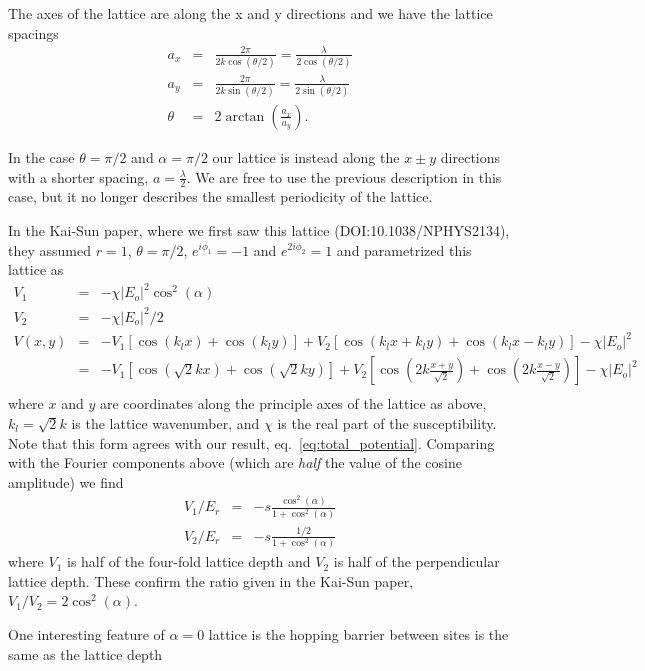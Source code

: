 \documentclass{article}
\theoremstyle{definition}
\begin{document}
The axes of the lattice are along the x and y directions and we have the lattice spacings
\begin{eqnarray}
  a_x &=& \frac{2\pi}{2k\cos(\theta/2)} = \frac{\lambda}{2\cos(\theta/2)} \\
  a_y &=& \frac{2\pi}{2k\sin(\theta/2)} = \frac{\lambda}{2\sin(\theta/2)} \\
  \theta &=& 2 \arctan \left( \frac{a_x}{a_y} \right).
\end{eqnarray}

In the case $\theta = \pi/2$ and $\alpha = \pi/2$ our lattice is instead along the $x\pm y$ directions with a shorter spacing, $a = \frac{\lambda}{2}$. We are free to use the previous description in this case, but it no longer describes the smallest periodicity of the lattice.


In the Kai-Sun paper, where we first saw this lattice (DOI:10.1038/NPHYS2134), they assumed $r=1$, $\theta = \pi/2$, $e^{i\phi_1} = -1$ and $e^{2i\phi_2} = 1$ and parametrized this lattice as
\begin{eqnarray}
  V_1 &=& -\chi |E_o|^2 \cos^2(\alpha) \\
  V_2 &=& -\chi |E_o|^2 /2 \\
  V(x,y) &=& -V_1 [\cos(k_l x) + \cos(k_l y)] + V_2[\cos(k_l x+k_l y) + \cos(k_l x - k_l y)] - \chi |E_o|^2\\
  &=& -V_1 [\cos(\sqrt{2} k x) + \cos(\sqrt{2} k y)] + V_2 \left[\cos \left(2 k \frac{x+y}{\sqrt{2}} \right) + \cos \left(2 k \frac{x-y}{\sqrt{2}}\right) \right] - \chi |E_o|^2\\
\end{eqnarray}
where $x$ and $y$ are coordinates along the principle axes of the lattice as above, $k_l = \sqrt{2}k$ is the lattice wavenumber, and $\chi$ is the real part of the susceptibility. Note that this form agrees with our result, eq.~\ref{eq:total_potential}.  Comparing with the Fourier components above (which are \emph{half} the value of the cosine amplitude) we find
\begin{eqnarray}
V_1/E_r &=& -s \frac{\cos^2(\alpha)}{1 + \cos^2(\alpha)}\\
V_2/E_r &=& -s \frac{1/2}{1 + \cos^2(\alpha)}
\end{eqnarray}
where $V_1$ is half of the four-fold lattice depth and $V_2$ is half of the perpendicular lattice depth. These confirm the ratio given in the Kai-Sun paper, $V_1/V_2 = 2 \cos^2(\alpha)$.

One interesting feature of $\alpha=0$ lattice is the hopping barrier between sites is the same as the lattice depth
\end{document}
